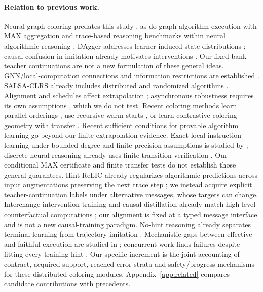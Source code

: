 \documentclass[10pt]{article}
\begin{document}
\paragraph{Relation to previous work.}
Neural graph coloring predates this study \citep{lemos2019coloring}, as do
graph-algorithm execution with MAX aggregation \citep{velickovic2020execution}
and trace-based reasoning benchmarks \citep{velickovic2022clrs} within neural
algorithmic reasoning \citep{velickovic2021nar}.
DAgger addresses learner-induced state distributions \citep{ross2011dagger};
causal confusion in imitation already motivates interventions
\citep{dehaan2019causal}. Our fixed-bank teacher continuations are not a new
formulation of these general ideas. GNN/local-computation connections and
information restrictions are established
\citep{loukas2020depth,sato2019approximation}. SALSA-CLRS already includes
distributed and randomized algorithms \citep{minder2023salsa}. Alignment and
schedules affect extrapolation \citep{xu2020reason,xu2021extrapolate,mathys2023flood}; asynchronous robustness
requires its own assumptions \citep{solodova2025hogwild}, which we do not test.
Recent coloring methods learn parallel orderings \citep{langedal2025ordering},
use recursive warm starts \citep{vanderbush2026warm}, or learn contrastive
coloring geometry with transfer \citep{le2026contrastive}. Recent sufficient
conditions for provable algorithm learning \citep{wittig2026which} go beyond
our finite extrapolation evidence. Exact local-instruction learning under
bounded-degree and finite-precision assumptions is studied by
\citet{qharabagh2026exact}; discrete neural reasoning already uses finite
transition verification \citep{rodionov2025discrete}. Our conditional MAX
certificate and finite transfer tests do not establish those general guarantees.
Hint-ReLIC already regularizes algorithmic predictions across input
augmentations preserving the next trace step \citep{bevilacqua2023causal};
we instead acquire explicit teacher-continuation labels under alternative
messages, whose targets can change. Interchange-intervention training and
causal distillation already match high-level counterfactual computations
\citep{geiger2022inducing,wu2022causal}; our alignment is fixed at a typed
message interface and is not a new causal-training paradigm. No-hint reasoning already separates
terminal learning from trajectory imitation \citep{rodionov2023without}.
Mechanistic gaps between effective and faithful execution are studied in
\citet{saldyt2025mind}; concurrent work finds failures despite fitting every
training hint \citep{najafgholizadeh2026premature}. Our specific increment is
the joint accounting of contract, acquired support, reached error strata and
safety/progress mechanisms for these distributed coloring modules.
Appendix~\ref{app:related} compares candidate contributions with precedents.
\end{document}

